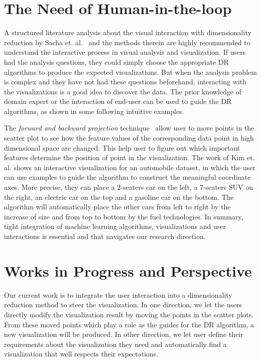 \section{The Need of Human-in-the-loop}
A structured literature analysis about the visual interaction with dimensionality reduction by Sacha et. al.~\cite{Sacha2017Interaction} and the methods therein are highly recommended to understand the interactive process in visual analysis and visualization.
If users had the analysis questions, they could simply choose the appropriate DR algorithms to produce the expected visualizations.
But when the analysis problem is complex and they have not had these questions beforehand, interacting with the visualizations is a good idea to discover the data.
The prior knowledge of domain expert or the interaction of end-user can be used to guide the DR algorithms, as shown in some following intuitive examples.

The \emph{forward and backward projection} technique~\cite{cavallo2017FWBW} allow user to move points in the scatter plot to see how the feature values of the corresponding data point in high dimensional space are changed. This help user to figure out which important features determine the position of point in the visualization.
The work of Kim et. al. \cite{Kim2016InterAxis} shows an interactive visualization for an automobile dataset, in which the user can use examples to guide the algorithm to construct the meaningful coordinate axes.
More precise, they can place a 2-seaters car on the left, a 7-seaters SUV on the right, an electric car on the top and a gasoline car on the bottom. The algorithm will automatically place the other cars from left to right by the increase of size and from top to bottom by the fuel technologies.
In summary, tight integration of machine learning algorithms, visualizations and user interactions is essential and that navigates our research direction.


\section{Works in Progress and Perspective}

Our current work is to integrate the user interaction into a dimensionality reduction method to steer the visualization.
In one direction, we let the users directly modify the visualization result by moving the points in the scatter plots.
From these moved points which play a role as the guides for the DR algorithm, a new visualization will be produced.
In other direction, we let user define their requirements about the visualization they need and automatically find a visualization that well respects their expectations.

